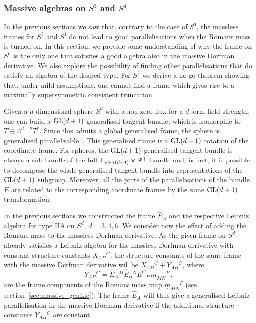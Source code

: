 \documentclass[debug]{phd}
\begin{document}
		\subsubsection{Massive algebras on $S^3$ and $S^4$}\label{massive_algebras}
				In the previous sections we saw that, contrary to the case of $S^6$, the massless frames for $S^3$ and $S^4$ do not lead to good parallelisations when the Romans mass is turned on. 
				In this section, we provide some understanding of why the frame on $S^6$ is the only one that satisfies a good algebra also in the massive Dorfman derivative. 
				We also explore the possibility of finding other parallelisations that do satisfy an algebra of the desired type.
				For $S^3$ we derive a no-go theorem showing that, under mild assumptions, one cannot find a frame which gives rise to a maximally supersymmetric consistent truncation.

				Given a $d$-dimensional sphere $S^d$ with a non-zero flux for a $d$-form field-strength, one can build a $\mathrm{GL}(d+1)$ generalised tangent bundle, which is isomorphic to $T\oplus \Lambda^{d-2}T^*$. 
				Since this admits a global generalised frame, the sphere is generalised parallelisable~\cite{spheres}. 
				This generalised frame is a $\mathrm{GL}(d+1)$ rotation of the coordinate frame. 
				For spheres, the $\mathrm{GL}(d+1)$ generalised tangent bundle is always a sub-bundle of the full $\mathrm{E}_{d+1(d+1)}\times\mathbb{R}^+$ bundle and, in fact, it is possible to decompose the whole generalised tangent bundle into representations of the $\mathrm{GL}(d+1)$ subgroup. 
				Moreover, all the parts of the parallelisations of the bundle $E$ are related to the corresponding coordinate frames by the same $\mathrm{GL}(d+1)$ transformation.

				In the previous sections we constructed the frame $\hat{E}_A$ and the respective Leibniz algebra for type IIA on $S^d$, $d=3,4,6$. 
				We consider now the effect of adding the Romans mass to the massless Dorfman derivative. 
				As the given frame on $S^d$ already satisfies a Leibniz algebra for the massless Dorfman derivative with constant structure constants $X_{AB}{}^C$, the structure constants of the same frame with the massive Dorfman derivative will be $X_{AB}{}^C + Y_{AB}{}^C$, where
							\begin{equation}
								Y_{AB}{}^C = \hat{E}_A{}^M \hat{E}_B{}^N E^C{}_P\, \underline{m}_{MN}{}^P \, , 
							\end{equation}
				are the frame components of the Romans mass map $\underline{m}_{MN}{}^P$ (see section~\ref{sec:massive_genLie}).
				The frame $\hat{E}_A$ will thus give a generalised Leibniz parallelisation in the massive Dorfman derivative if the additional structure constants $Y_{AB}{}^C$ are constant.
 
\end{document}
